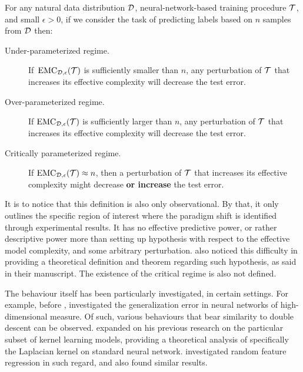 \documentclass[10pt]{article} %
\begin{document}
\begin{hypothesis} \label{hyp:informaldd}
For any natural data distribution $\mathcal{D}$, neural-network-based training procedure $\mathcal{T}$, and small $\epsilon>0$,
if we consider the task of predicting labels based on  $n$ samples from $\mathcal{D}$ then:
\begin{description}
    \item[Under-parameterized regime.]  If~$\mathrm{EMC}_{\mathcal{D},\epsilon}(\mathcal{T})$ is sufficiently smaller than $n$, any perturbation of $\mathcal{T}$ that increases its effective complexity will decrease the test error.
    \item[Over-parameterized regime.] If $\mathrm{EMC}_{\mathcal{D},\epsilon}(\mathcal{T})$ is sufficiently larger than $n$,
    any perturbation of $\mathcal{T}$ that increases its effective complexity will decrease the test error.
    
    \item[Critically parameterized regime.] If $\mathrm{EMC}_{\mathcal{D},\epsilon}(\mathcal{T}) \approx n$, then
    a perturbation of $\mathcal{T}$ that increases its effective complexity
    might decrease {\bf or increase} the test error.
\end{description}
\end{hypothesis}

It is to notice that this definition is also only observational. By that, it only outlines the specific region of interest where the paradigm shift is identified through experimental results. It has no effective predictive power, or rather descriptive power more than setting up hypothesis with respect to the effective model complexity, and some arbitrary perturbation. \cite{nakkiran_deep_2019} also noticed this difficulty in providing a theoretical definition and theorem regarding such hypothesis, as said in their manuscript. The existence of the critical regime is also not defined. 

The behaviour itself has been particularly investigated, in certain settings. For example, before \cite{belkin_reconciling_2019}, \cite{advani2017highdimensionaldynamicsgeneralizationerror} investigated the generalization error in neural networks of high-dimensional measure. Of such, various behaviours that bear similarity to double descent can be observed. \cite{belkin2018understanddeeplearningneed} expanded on his previous research on the particular subset of kernel learning models, providing a theoretical analysis of specifically the Laplacian kernel on standard neural network. \cite{mei2020generalizationerrorrandomfeatures} investigated random feature regression in such regard, and also found similar results. 
\end{document}
